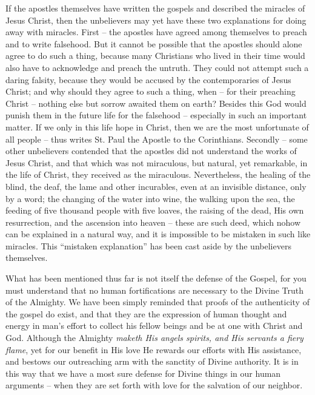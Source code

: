 If the apostles themselves have written the gospels and described the miracles of Jesus Christ, then the unbelievers may yet have these two explanations for doing away with miracles. First -- the apostles have agreed among themselves to preach and to write falsehood. But it cannot be possible that the apostles should alone agree to do such a thing, because many Christians who lived in their time would also have to acknowledge and preach the untruth. They could not attempt such a daring falsity, because they would be accused by the contemporaries of Jesus Christ; and why should they agree to such a thing, when -- for their preaching Christ -- nothing else but sorrow awaited them on earth? Besides this God would punish them in the future life for the falsehood -- especially in such an important matter. If we only in this life hope in Christ, then we are the most unfortunate of all people -- thus writes St. Paul the Apostle to the Corinthians.  Secondly -- some other unbelievers contended that the apostles did not understand the works of Jesus Christ, and that which was not miraculous, but natural, yet remarkable, in the life of Christ, they received as the miraculous. Nevertheless, the healing of the blind, the deaf, the lame and other incurables, even at an invisible distance, only by a word; the changing of the water into wine, the walking upon the sea, the feeding of five thousand people with five loaves, the raising of the dead, His own resurrection, and the ascension into heaven -- these are such deed, which nohow can be explained in a natural way, and it is impossible to be mistaken in such like miracles. This ``mistaken explanation'' has been cast aside by the unbelievers themselves.

What has been mentioned thus far is not itself the defense of the Gospel, for you must understand that no human fortifications are necessary to the Divine Truth of the Almighty. We have been simply reminded that proofs of the authenticity of the gospel do exist, and that they are the expression of human thought and energy in man's effort to collect his fellow beings and be at one with Christ and God. Although the Almighty \textit{maketh His angels spirits, and His servants a fiery flame}, yet for our benefit in His love He rewards our efforts with His assistance, and bestows our outreaching arm with the sanctity of Divine authority. It is in this way that we have a most sure defense for Divine things in our human arguments -- when they are set forth with love for the salvation of our neighbor.

